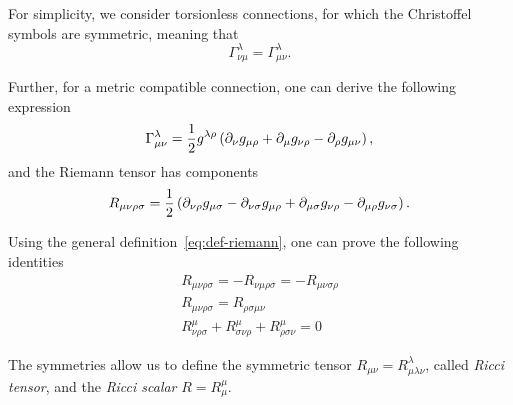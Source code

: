 For simplicity, we consider torsionless connections, for which the Christoffel symbols are symmetric, meaning that
\begin{equation}
    \Gamma^\lambda_{\nu\mu} = \Gamma^\lambda_{\mu\nu} .
\end{equation}

Further, for a metric compatible connection, one can derive the following expression
\begin{equation}
    \Gamma^\lambda_{\mu\nu} = \frac{1}{2} g^{\lambda\rho} \left( \partial_\nu g_{\mu\rho} + \partial_\mu g_{\nu\rho} - \partial_\rho g_{\mu\nu} \right),
\end{equation}
and the Riemann tensor has components
\begin{equation}
    R_{\mu\nu\rho\sigma} = \frac{1}{2} \left( \partial_{\nu\rho} g_{\mu\sigma} - \partial_{\nu\sigma} g_{\mu\rho} + \partial_{\mu\sigma} g_{\nu\rho} - \partial_{\mu\rho} g_{\nu\sigma} \right) .
\end{equation}

Using the general definition~\eqref{eq:def-riemann}, one can prove the following identities
\begin{subequations}
\begin{gather}
    R_{\mu\nu\rho\sigma} = - R_{\nu\mu\rho\sigma} = - R_{\mu\nu\sigma\rho} \\
    R_{\mu\nu\rho\sigma} = R_{\rho\sigma\mu\nu} \\
    R^\mu_{\nu\rho\sigma} + R^\mu_{\sigma\nu\rho} + R^\mu_{\rho\sigma\nu} = 0
\end{gather}
\end{subequations}

The symmetries allow us to define the symmetric tensor $R_{\mu\nu} = R^\lambda_{\mu\lambda\nu}$, called \emph{Ricci tensor}, and the \emph{Ricci scalar} $R = R^\mu_\mu$.